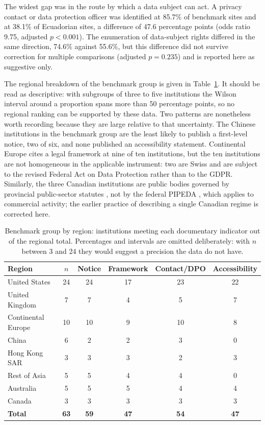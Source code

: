 \documentclass[pdflatex,sn-basic,Numbered]{sn-jnl}
\theoremstyle{thmstyleone}
\theoremstyle{thmstyletwo}
\theoremstyle{thmstylethree}
\begin{document}
The widest gap was in the route by which a data subject can act. A privacy contact or data protection officer was identified at 85.7\% of benchmark sites and at 38.1\% of Ecuadorian sites, a difference of 47.6 percentage points (odds ratio 9.75, adjusted $p<0.001$). The enumeration of data-subject rights differed in the same direction, 74.6\% against 55.6\%, but this difference did not survive correction for multiple comparisons (adjusted $p=0.235$) and is reported here as suggestive only.

The regional breakdown of the benchmark group is given in Table~\ref{tab:reg}. It should be read as descriptive: with subgroups of three to five institutions the Wilson interval around a proportion spans more than 50 percentage points, so no regional ranking can be supported by these data. Two patterns are nonetheless worth recording because they are large relative to that uncertainty. The Chinese institutions in the benchmark group are the least likely to publish a first-level notice, two of six, and none published an accessibility statement. Continental Europe cites a legal framework at nine of ten institutions, but the ten institutions are not homogeneous in the applicable instrument: two are Swiss and are subject to the revised Federal Act on Data Protection \citep{fadp_ch} rather than to the GDPR. Similarly, the three Canadian institutions are public bodies governed by provincial public-sector statutes \citep{fippa_on,fippa_bc,quebec_privacy}, not by the federal PIPEDA \citep{pipeda2000}, which applies to commercial activity; the earlier practice of describing a single Canadian regime is corrected here.

\begin{table}[htbp]
	\centering
	\caption{Benchmark group by region: institutions meeting each documentary indicator out of the regional total. Percentages and intervals are omitted deliberately: with $n$ between 3 and 24 they would suggest a precision the data do not have.}\label{tab:reg}
	\small
	\begin{tabular}{@{}lccccc@{}}
		\toprule
		\textbf{Region} & \textbf{$n$} & \textbf{Notice} & \textbf{Framework} & \textbf{Contact/DPO} & \textbf{Accessibility} \\
		\midrule
		United States & 24 & 24 & 17 & 23 & 22 \\
		United Kingdom & 7 & 7 & 4 & 5 & 7 \\
		Continental Europe & 10 & 10 & 9 & 10 & 8 \\
		China & 6 & 2 & 2 & 3 & 0 \\
		Hong Kong SAR & 3 & 3 & 3 & 2 & 3 \\
		Rest of Asia & 5 & 5 & 4 & 4 & 0 \\
		Australia & 5 & 5 & 5 & 4 & 4 \\
		Canada & 3 & 3 & 3 & 3 & 3 \\
		\midrule
		\textbf{Total} & \textbf{63} & \textbf{59} & \textbf{47} & \textbf{54} & \textbf{47} \\
		\bottomrule
	\end{tabular}
\end{table}
\end{document}
